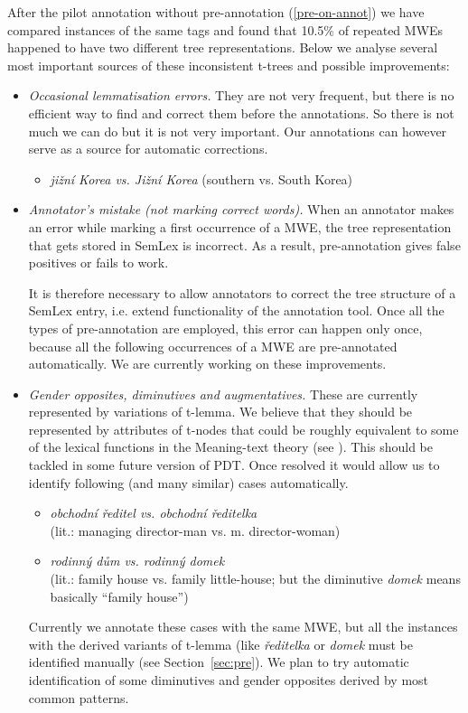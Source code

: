 After the pilot annotation without pre-annotation (\ref{pre-on-annot})  we have compared instances of the same tags and found that 10.5\% of repeated MWEs happened to have two different tree representations. Below we analyse several most important sources of these inconsistent t-trees and possible improvements:
\begin{itemize}
%
\item \emph{Occasional lemmatisation errors.} They are not very frequent, but there is no efficient way to find and correct them before the annotations. So there is not much we can do but it is not very important. Our annotations can however serve as a source for automatic corrections.
	\begin{itemize}
	\item \textit{jižní Korea {\rm vs.} Jižní Korea} (southern vs. South Korea)
	\end{itemize}
\item \emph{Annotator's mistake (not marking correct words).} When an annotator makes an error while marking a first occurrence of a MWE, the tree representation that gets stored in SemLex is incorrect. As a result, pre-annotation gives false positives or fails to work. 

It is therefore necessary to allow annotators to correct the tree structure of a SemLex entry, i.e. extend functionality of the annotation tool. Once all the types of pre-annotation are employed, this error can happen only once, because all the following occurrences of a MWE are pre-annotated automatically. We are currently working on these improvements.
%
\item \emph{Gender opposites, diminutives and augmentatives.} These are currently represented by variations of t-lemma. 
We believe that they should be represented by attributes of t-nodes %
that could be roughly equivalent to some of the lexical functions in the Meaning-text theory (see \cite{melcuk:1992}).
This should be tackled in some future version of PDT. Once resolved it would allow us to identify following (and many similar) cases automatically. 
	\begin{itemize}
	\item \textit{obchodní ředitel {\rm vs.} obchodní ředitelka} \\(lit.: managing director-man vs. m. director-woman)
	\item \textit{rodinný dům {\rm vs.} rodinný domek} \\(lit.: family house vs. family little-house; but the diminutive \emph{domek} means basically “family house”)
	\end{itemize}
%
Currently we annotate these cases with the same MWE, but all the instances with the derived variants of t-lemma (like \emph{ředitelka } or \emph{domek} must be identified manually (see Section~\ref{sec:pre}). We plan to try automatic identification of some diminutives and gender opposites derived by most common patterns.


\end{itemize}
